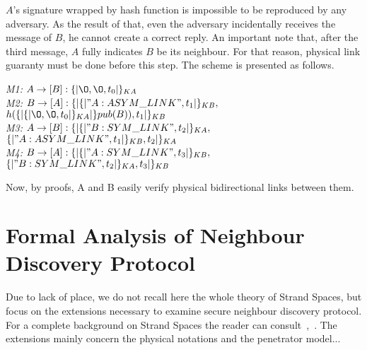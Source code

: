 $A$'s signature wrapped by hash function is impossible to be reproduced by any adversary. As the result of that, even the adversary incidentally receives the message of $B$, he cannot create a correct reply. An important note that, after the third message, $A$ fully indicates $B$ be its neighbour. For that reason, physical link guaranty must be done before this step. The scheme is presented as follows. 

\begin{flushleft}
 \emph{M1:} $A \to [B]: \{|\O, \O, t_0|\}_{KA}$\\
 \emph{M2:} $B \to [A]: \{|\{|"A:ASYM\_LINK", t_1|\}_{KB},$ $h(\{|\{|\O, \O, t_0|\}_{KA}|\}pub(B)),t_1|\}_{KB}$\\
\emph{M3:} $A \to [B]: \{|\{| "B:SYM\_LINK",t_2|\}_{KA},$ $\{|"A:ASYM\_LINK", t_1|\}_{KB},t_2 |\}_{KA}$\\
 \emph{M4:} $B \to [A] : \{|\{| "A:SYM\_LINK", t_3|\}_{KB},$ $\{| "B:SYM\_LINK",t_2|\}_{KA} ,t_3|\}_{KB}$
\end{flushleft}

Now, by proofs, A and B easily verify physical bidirectional links between them. 

\section{Formal Analysis of Neighbour Discovery Protocol}



Due to lack of place, we do not recall here the whole theory of Strand Spaces, but focus on the extensions necessary to examine secure neighbour discovery protocol. For a complete background on Strand Spaces the reader can consult~\cite{674832},~\cite{Guttman:2002:ATS:568264.568267}. The extensions mainly concern the physical notations and the penetrator model...
 
